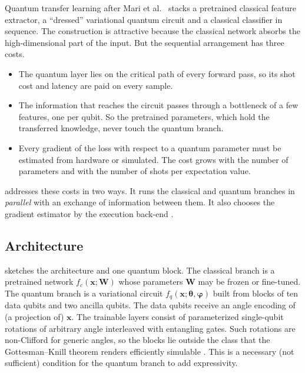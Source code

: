 Quantum transfer learning after Mari et al.~\cite{mari2020transferlearning} stacks a pretrained classical feature extractor, a ``dressed'' variational quantum circuit and a classical classifier in sequence. The construction is attractive because the classical network absorbs the high-dimensional part of the input. But the sequential arrangement has three costs.
\begin{itemize}
\item The quantum layer lies on the critical path of every forward pass, so its shot cost and latency are paid on every sample.
\item The information that reaches the circuit passes through a bottleneck of a few features, one per qubit. So the pretrained parameters, which hold the transferred knowledge, never touch the quantum branch.
\item Every gradient of the loss with respect to a quantum parameter must be estimated from hardware or simulated. The cost grows with the number of parameters and with the number of shots per expectation value.
\end{itemize}
\qpie{} addresses these costs in two ways. It runs the classical and quantum branches in \emph{parallel} with an exchange of information between them. It also chooses the gradient estimator by the execution back-end \cite{guo2025qpie}.

\subsection{Architecture}\label{sec:qml:qpie:arch}

 sketches the architecture and one quantum block. The classical branch is a pretrained network $f_c(\bm{x}; \bm{W})$ whose parameters $\bm{W}$ may be frozen or fine-tuned. The quantum branch is a variational circuit $f_q(\bm{x}; \bm{\theta}, \bm{\varphi})$ built from blocks of ten data qubits and two ancilla qubits. The data qubits receive an angle encoding of (a projection of) $\bm{x}$. The trainable layers consist of parameterized single-qubit rotations of arbitrary angle interleaved with entangling gates. Such rotations are non-Clifford for generic angles, so the blocks lie outside the class that the Gottesman--Knill theorem renders efficiently simulable \cite{aaronson2004stabilizer}. This is a necessary (not sufficient) condition for the quantum branch to add expressivity.


